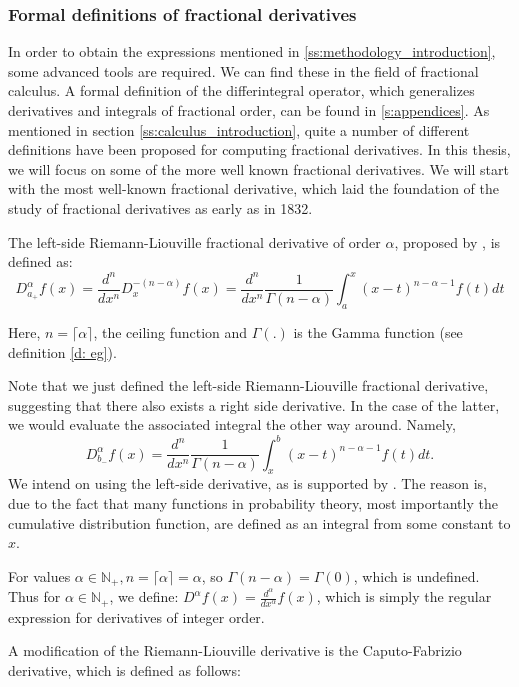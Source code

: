 \subsubsection{Formal definitions of fractional derivatives}
In order to obtain the expressions mentioned in \ref{ss:methodology_introduction}, some advanced tools are required. We can find these in the field of fractional calculus. A formal definition of the differintegral operator, which generalizes derivatives and integrals of fractional order, can be found in \ref{s:appendices}. As mentioned in section \ref{ss:calculus_introduction}, quite a number of different definitions have been proposed for computing fractional derivatives. In this thesis, we will focus on some of the more well known fractional derivatives. We will start with the most well-known fractional derivative, which laid the foundation of the study of fractional derivatives as early as in 1832.
\begin{definition}
    The left-side Riemann-Liouville fractional derivative of order \(\alpha\), proposed by \citet{liouville1832},  is defined as:
    \begin{equation}
        D^{\alpha}_{a_+} f(x) =  \frac{d^{n}}{dx^{n}} D_{x}^{-(n - \alpha)} f(x) = \frac{d^n}{dx^n} \frac{1}{\Gamma(n -\alpha)}  \int_{a}^{x} (x-t)^{n - \alpha-1} f(t) dt
    \end{equation}

    Here, \(n = \lceil \alpha \rceil\), the ceiling function and \(\Gamma(.)\) is the Gamma function (see definition \ref{d: eg}).

    Note that we just defined the left-side Riemann-Liouville fractional derivative, suggesting that there also exists a right side derivative. In the case of the latter, we would evaluate the associated integral the other way around. Namely, \[D^{\alpha}_{b_-} f(x) = \frac{d^n}{dx^n} \frac{1}{\Gamma(n -\alpha)}  \int_{x}^{b} (x-t)^{n - \alpha-1} f(t) dt.\] We intend on using the left-side derivative, as is supported by \citet{tarasov2023}. The reason is, due to the fact that many functions in probability theory, most importantly the cumulative distribution function, are defined as an integral from some constant to \(x\). 
    
    \begin{remark}\label{r: integer}
        For values \(\alpha \in \mathbb{N}_+, n =  \lceil \alpha \rceil = \alpha\), so \(\Gamma(n - \alpha) = \Gamma(0)\), which is undefined. Thus for \(\alpha \in \mathbb{N}_+\), we define: \(D^\alpha f(x) = \frac{d^\alpha}{dx^\alpha} f(x)\), which is simply the regular expression for derivatives of integer order.
    \end{remark}
   
\end{definition}
A modification of the Riemann-Liouville derivative is the Caputo-Fabrizio derivative, which is defined as follows:

